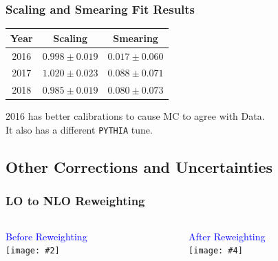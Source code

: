 \documentclass{beamer}
\newcommand{\twofigs}[4]{
  \begin{columns}
    \begin{column}{0.5\linewidth}
      \centering
      \textcolor{blue}{#1} \\
      \texttt{[image: \#2]}
    \end{column}
    \begin{column}{0.5\linewidth}
      \centering
      \textcolor{blue}{#3} \\
      \texttt{[image: \#4]}
    \end{column}
  \end{columns}
}
\begin{document}
\begin{frame}
  \frametitle{Scaling and Smearing Fit Results}

  \begin{center}
    \begin{tabular}{c|c|c}
      \hline
      Year & Scaling & Smearing \\
      \hline
      2016 & $0.998 \pm 0.019$ & $0.017 \pm 0.060$ \\
      2017 & $1.020 \pm 0.023$ & $0.088 \pm 0.071$ \\
      2018 & $0.985 \pm 0.019$ & $0.080 \pm 0.073$ \\
      \hline
    \end{tabular}
  \end{center}

  \vfill

  2016 has better calibrations to cause MC to agree with Data. \\
  It also has a different \texttt{PYTHIA} tune.


\end{frame}

\subsection{Other Corrections and Uncertainties}

\begin{frame}
  \frametitle{LO to NLO Reweighting}

  \twofigs{Before Reweighting}
          {figures/Vjets_NLOreweighting_2017V5_Znn_withoutWeight.pdf}
          {After Reweighting}
          {figures/Vjets_NLOreweighting_2017V5_Znn_withWeight.pdf}

\end{frame}
\end{document}
